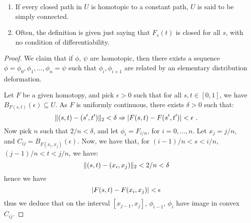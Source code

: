 \begin{remark}
  \begin{enumerate}
  \item If every closed path in $U$ is homotopic to a constant path, $U$ is said to be simply connected.
  \item Often, the definition is given just saying that $F_s(t)$ is closed for all $s$, with no condition of differentiability.
  \end{enumerate}
\end{remark}

\begin{proof}
  We claim that if $\phi$, $\psi$ are homotopic, then there exists a sequence $\phi = \phi_0, \phi_1, \dotsc, \phi_n = \psi$ such that $\phi_i, \phi_{i+1}$ are related by an elementary distribution deformation.

Let $F$ be a given homotopy, and pick $\epsilon > 0$ such that for all $s, t \in [0, 1]$, we have $B_{F(s, t)}(\epsilon) \subseteq U$.
As $F$ is uniformly continuous, there exists $\delta > 0$ such that:
\[
\norm{(s,t) - (s', t')}_2 < \delta \Rightarrow \abs*{F(s, t) - F(s', t')} < \epsilon \mpunct{.}
\]
Now pick $n$ such that $2/n < \delta$, and let $\phi_i = F_{i/n}$, for $i = 0, \dotsc, n$. Let $x_j = j/n$, and $C_{ij} = B_{F(x_i, x_j)}(\epsilon)$.
Now, we have that, for $(i-1)/n < s < i/n$, $(j-1)/n < t < j/n$, we have:
\[
\norm{(s, t) - (x_i, x_j)}_2 < 2/n < \delta
\]
hence we have
\[
\abs*{F(s, t) - F(x_i, x_j)} < \epsilon
\]
thus we deduce that on the interval $[x_{j-1}, x_j]$, $\phi_{i-1}$, $\phi_i$ have image in convex $C_{ij}$.
\end{proof}

